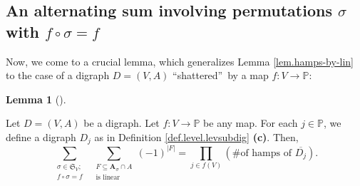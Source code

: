 \documentclass[numbers=enddot,12pt,final,onecolumn,notitlepage]{scrartcl}%
\numberwithin{exer}{section}
\theoremstyle{definition}
\newtheorem{lem}[theo]{Lemma}
\newenvironment{lemma}[1][]
{\begin{lem}[#1]\begin{leftbar}}
{\end{leftbar}\end{lem}}
\let\sumnonlimits\sum
\let\prodnonlimits\prod
\renewcommand{\sum}{\sumnonlimits\limits}
\renewcommand{\prod}{\prodnonlimits\limits}
\begin{document}
\subsection{An alternating sum involving permutations $\sigma$ with
$f\circ\sigma=f$}

Now, we come to a crucial lemma, which generalizes Lemma
\ref{lem.hamps-by-lin} to the case of a digraph $D=\left(  V,A\right)  $
\textquotedblleft shattered\textquotedblright\ by a map $f:V\rightarrow
\mathbb{P}$:

\begin{lemma}
\label{lem.hamps-by-lin-f}Let $D=\left(  V,A\right)  $ be a digraph. Let
$f:V\rightarrow\mathbb{P}$ be any map. For each $j\in\mathbb{P}$, we define a
digraph $D_{j}$ as in Definition \ref{def.level.levsubdig} \textbf{(c)}. Then,%
\[
\sum_{\substack{\sigma\in\mathfrak{S}_{V};\\f\circ\sigma=f}}\ \ \sum
_{\substack{F\subseteq\mathbf{A}_{\sigma}\cap A\\\text{is linear}}}\left(
-1\right)  ^{\left\vert F\right\vert }=\prod_{j\in f\left(  V\right)  }\left(
\text{\# of hamps of }\overline{D_{j}}\right)  .
\]

\end{lemma}
\end{document}
